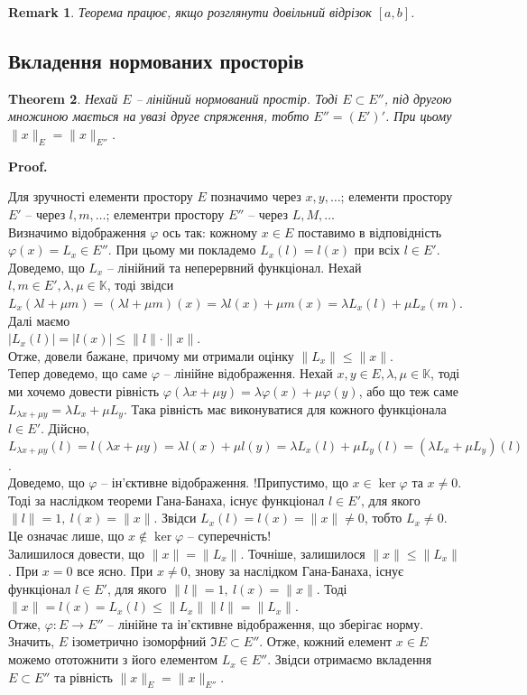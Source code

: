 \documentclass[a4paper, 10pt]{article}
\makeatletter
\theoremstyle{theoremdd}
\newtheorem{theorem}{Theorem}[subsection]
\theoremstyle{theoremdd}
\theoremstyle{theoremdd}
\theoremstyle{theoremdd}
\theoremstyle{theoremdd}
\theoremstyle{theoremdd}
\newtheorem{remark}[theorem]{Remark}
\theoremstyle{theoremdd}
\theoremstyle{theoremdd}
\renewenvironment{proof}[1][Proof.\\]{\par
\pushQED{\hfill \qed}%
\normalfont \topsep6\p@\@plus6\p@\relax
\trivlist
\item\relax
{\bfseries
#1\@addpunct{.}}\hspace\labelsep\ignorespaces
}{%
\popQED\endtrivlist\@endpefalse
}
\makeatother
\begin{document}
\begin{remark}
Теорема працює, якщо розглянути довільний відрізок $[a,b]$.
\end{remark}

\subsection{Вкладення нормованих просторів}
\begin{theorem}
Нехай $E$ -- лінійний нормований простір. Тоді $E \subset E''$, під другою множиною мається на увазі друге спряження, тобто $E'' = (E')'$. При цьому $\|x\|_E = \|x\|_{E''}$.
\end{theorem}

\begin{proof}
Для зручності елементи простору $E$ позначимо через $x,y,\dots$; елементи простору $E'$ -- через $l,m,\dots$; елементри простору $E''$ -- через $L,M,\dots$\\
Визначимо відображення $\varphi$ ось так: кожному $x \in E$ поставимо в відповідність $\varphi(x) = L_x \in E''$. При цьому ми покладемо $L_x(l) = l(x)$ при всіх $l \in E'$. \\
Доведемо, що $L_x$ -- лінійний та неперервний функціонал. Нехай $l,m \in E', \lambda,\mu \in \mathbb{K}$, тоді звідси $L_x(\lambda l + \mu m) = (\lambda l + \mu m)(x) = \lambda l(x) + \mu m(x) = \lambda L_x(l) + \mu L_x(m)$. Далі маємо\\
$|L_x(l)| = |l(x)| \leq \|l\| \cdot \|x\|$.\\
Отже, довели бажане, причому ми отримали оцінку $\|L_x\| \leq \|x\|$.\\
Тепер доведемо, що саме $\varphi$ -- лінійне відображення. Нехай $x,y \in E, \lambda, \mu \in \mathbb{K}$, тоді ми хочемо довести рівність $\varphi(\lambda x + \mu y) = \lambda \varphi(x) + \mu \varphi(y)$, або що теж саме $L_{\lambda x + \mu y} = \lambda L_x + \mu L_y$. Така рівність має виконуватися для кожного функціонала $l \in E'$. Дійсно,\\
$L_{\lambda x + \mu y}(l) = l(\lambda x + \mu y) = \lambda l(x) + \mu l(y) = \lambda L_x(l) + \mu L_y(l) = (\lambda L_x + \mu L_y)(l)$.\\
Доведемо, що $\varphi$ -- ін'єктивне відображення. !Припустимо, що $x \in \ker \varphi$ та $x \neq 0$. Тоді за наслідком теореми Гана-Банаха, існує функціонал $l \in E'$, для якого $\|l\| = 1,\ l(x) = \|x\|$. Звідси $L_x(l) = l(x) = \|x\| \neq 0$, тобто $L_x \neq 0$. Це означає лише, що $x \notin \ker \varphi$ -- суперечність!\\
Залишилося довести, що $\|x\| = \|L_x\|$. Точніше, залишилося $\|x\| \leq \|L_x\|$. При $x = 0$ все ясно. При $x \neq 0$, знову за наслідком Гана-Банаха, існує функціонал $l \in E'$, для якого $\|l\| = 1,\ l(x) = \|x\|$. Тоді\\
$\|x\| = l(x) = L_x(l) \leq \|L_x\| \|l\| = \|L_x\|$.\\
Отже, $\varphi \colon E \to E''$ -- лінійне та ін'єктивне відображення, що зберігає норму. Значить, $E$ ізометрично ізоморфний $\Im E \subset E''$. Отже, кожний елемент $x \in E$ можемо ототожнити з його елементом $L_x \in E''$. Звідси отримаємо вкладення $E \subset E''$ та рівність $\|x\|_E = \|x\|_{E''}$.
\end{proof}
\end{document}
